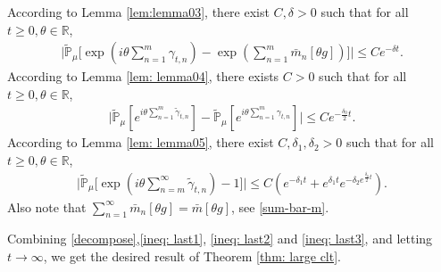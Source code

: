 \documentclass[12pt,a4paper]{amsart}
\theoremstyle{plain}
\theoremstyle{definition}
\numberwithin{equation}{section}
\begin{document}
    According to Lemma \ref{lem:lemma03}, there exist $C,\delta>0$ such that for all $t\geq 0,\theta\in\mathbb{R}$, 
\begin{align}\label{ineq: last1}
    \Big|\tilde{\mathbb{P}}_{\mu}\Big[\exp(i\theta\sum_{n=1}^m\gamma_{t,n})-\exp(\sum_{n=1}^m\bar{m}_n[\theta g])\Big]
    \Big|\leq C e^{-\delta t}.
\end{align}
    According to Lemma \ref{lem: lemma04}, there exists $C>0$ such that for all $t\geq 0,\theta\in\mathbb{R}$, 
\begin{align}\label{ineq: last2}
    \Big|\tilde{\mathbb{P}}_{\mu}[e^{i\theta\sum_{n=1}^m \tilde{\gamma}_{t,n}}]-\tilde{\mathbb{P}}_{\mu}[e^{i\theta \sum_{n=1}^m\gamma_{t,n}}]\Big|\leq C  e^{-\frac{\delta_0}{2} t}.
 \end{align}
    According to Lemma \ref{lem: lemma05}, there exist $C,\delta_1,\delta_2>0$ such that for all $t\geq 0,\theta\in\mathbb{R}$, 
\begin{align}\label{ineq: last3}
    \Big|\tilde{\mathbb{P}}_{\mu}\Big[\exp(i\theta \sum_{n=m}^{\infty}\tilde{\gamma}_{t,n})-1\Big]\Big|\leq C(e^{-\delta_1 t}+e^{\delta_1 t}e^{-\delta_2 e^{\frac{\delta_0}{2}t}}).
\end{align}
    Also note that $\sum_{n=1}^\infty\bar{m}_n[\theta g]=\bar{m}[\theta g]$, see \eqref{sum-bar-m}.

    Combining \eqref{decompose},\eqref{ineq: last1}, \eqref{ineq: last2} and \eqref{ineq: last3}, and letting $t\to\infty$, we get the desired result of Theorem \ref{thm: large clt}.
\appendix
\section{}
\end{document}
